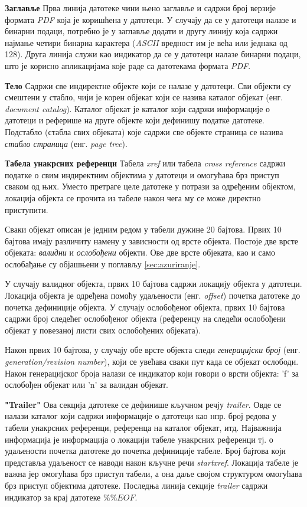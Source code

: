 \documentclass[12pt,oneside]{memoir}
\begin{document}
\begin{description}
\item \textbf{Заглавље} Прва линија датотеке чини њено заглавље и садржи број верзије формата \textit{PDF} која је коришћена у датотеци. У случају да се у датотеци налазе и бинарни подаци, потребно је у заглавље додати и другу линију која садржи најмање четири бинарна карактера (\textit{ASCII} вредност им је већа или једнака од 128). Друга линија служи као индикатор да се у датотеци налазе бинарни подаци, што је корисно апликацијама које раде са датотекама формата \textit{PDF}.
\item \textbf{Тело} Садржи све индиректне објекте који се налазе у датотеци.
Сви објекти су смештени у стабло, чији је корен објекат који се назива каталог објекат (енг. \textit{document catalog}). Каталог објекат је каталог који садржи информације о датотеци и реферише на друге објекте који дефинишу податке датотеке. 
Подстабло (стабла свих објеката) које садржи све објекте страница се назива \textit{стабло страница} (енг. \textit{page tree}). 
\item \textbf{Табела унакрсних референци} Табела \textit{xref} или табела \textit{cross reference} садржи податке о свим индиректним објектима у датотеци и омогућава брз приступ сваком од њих. Уместо претраге целе датотеке у потрази за одређеним објектом, локација објекта се прочита из табеле након чега му се може директно приступити.

Сваки објекат описан је једним редом у табели дужине 20 бајтова. Првих 10 бајтова имају различиту намену у зависности од врсте објекта. Постоје две врсте објеката: \textit{валидни} и \textit{ослобођени} објекти. Ове две врсте објеката, као и само ослобађање су објашњени у поглављу \ref{sec:azuriranje}. 

У случају валидног објекта, првих 10 бајтова садржи локацију објекта у датотеци. Локација објекта је одређена помоћу удаљености (енг. \textit{offset}) почетка датотеке до почетка дефиниције објекта. У случају ослобођеног објекта, првих 10 бајтова садржи број следећег ослобођеног објекта (референцу на следећи ослобођени објекат у повезаној листи свих ослобођених објеката).

Након првих 10 бајтова, у случају обе врсте објекта следи \textit{генерацијски број} (енг. \textit{generation/revision number}), који се увећава сваки пут када се објекат ослободи. Након генерацијског броја налази се индикатор који говори о врсти објекта: 'f' за ослобођен објекат или 'n' за валидан објекат. 
\item \textbf{"Trailer"} Ова секција датотеке се дефинише кључном речју \textit{trailer}. Овде се налази каталог који садржи информације о датотеци као нпр. број редова у табели унакрсних референци, референца на каталог објекат, итд. Најважнија информација је информација о локацији табеле унакрсних референци тј. о удаљености почетка датотеке до почетка дефиниције табеле. Број бајтова који представља удаљеност се наводи након кључне речи \textit{startxref}. Локација табеле је важна јер омогућава брз приступ табели, а она даље својом структуром омогућава брз приступ објектима датотеке. Последња линија секције \textit{trailer} садржи индикатор за крај датотеке $\%\%EOF$.
\end{description}
\end{document}

